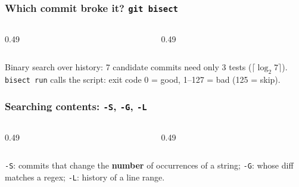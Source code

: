 \documentclass[aspectratio=169,10pt,compress]{beamer}
\begin{document}




\begin{frame}[t,fragile] \frametitle{Which commit broke it? \texttt{git bisect}}
  \begin{columns}[T]
    \begin{column}{0.49\textwidth}
    \end{column}
    \begin{column}{0.49\textwidth}
    \end{column}
  \end{columns}

  \vspace{0.1em}
  \small
  Binary search over history: 7 candidate commits need only 3 tests ($\lceil \log_{2} 7 \rceil$). \texttt{bisect run} calls the script:
  exit code 0 = good, 1--127 = bad (125 = skip).
\end{frame}




\begin{frame}[t,fragile] \frametitle{Searching contents: \texttt{-S}, \texttt{-G}, \texttt{-L}}
  \begin{columns}[T]
    \begin{column}{0.49\textwidth}
    \end{column}
    \begin{column}{0.49\textwidth}
    \end{column}
  \end{columns}

  \vspace{0.1em}
  \small
  \texttt{-S}: commits that change the \textbf{number} of occurrences of a string; \texttt{-G}: whose diff matches a regex; \texttt{-L}: history of a line range.
\end{frame}

\end{document}
